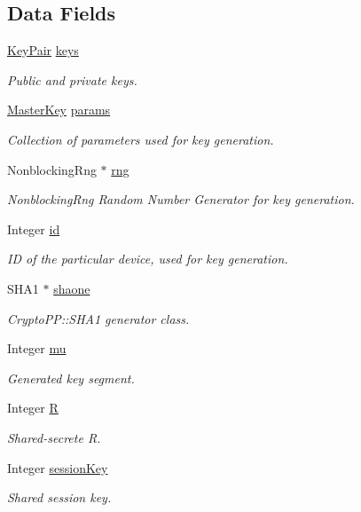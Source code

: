 \subsection*{Data Fields}
\begin{DoxyCompactItemize}
\item 
\hyperlink{structSMImp_1_1KeyPair}{Key\+Pair} \hyperlink{classSMImp_1_1Requester_a9203ce4677233f2dba858b5b6ec2d8be}{keys}
\begin{DoxyCompactList}\small\item\em Public and private keys. \end{DoxyCompactList}\item 
\hyperlink{structSMImp_1_1MasterKey}{Master\+Key} \hyperlink{classSMImp_1_1Requester_a140f38a7e3106bf0df39eb6370fca2f0}{params}
\begin{DoxyCompactList}\small\item\em Collection of parameters used for key generation. \end{DoxyCompactList}\item 
Nonblocking\+Rng $\ast$ \hyperlink{classSMImp_1_1Requester_aafd8f13c137f7372eda2e4f781048402}{rng}
\begin{DoxyCompactList}\small\item\em Nonblocking\+Rng Random Number Generator for key generation. \end{DoxyCompactList}\item 
Integer \hyperlink{classSMImp_1_1Requester_a16911083f2e3fc903ed3e6e7ca2a58b1}{id}
\begin{DoxyCompactList}\small\item\em ID of the particular device, used for key generation. \end{DoxyCompactList}\item 
S\+H\+A1 $\ast$ \hyperlink{classSMImp_1_1Requester_aab1bd0f1a383b17cad9e2621c2650411}{shaone}
\begin{DoxyCompactList}\small\item\em Crypto\+P\+P\+::\+S\+H\+A1 generator class. \end{DoxyCompactList}\item 
Integer \hyperlink{classSMImp_1_1Requester_a2acc3ab496a01ff90429b95d6af6ef32}{mu}
\begin{DoxyCompactList}\small\item\em Generated key segment. \end{DoxyCompactList}\item 
Integer \hyperlink{classSMImp_1_1Requester_ac5f95176425aabf5fa3fb4bb8d152167}{R}
\begin{DoxyCompactList}\small\item\em Shared-\/secrete R. \end{DoxyCompactList}\item 
Integer \hyperlink{classSMImp_1_1Requester_a95d364e3698162c3d3f2502da572bc23}{session\+Key}
\begin{DoxyCompactList}\small\item\em Shared session key. \end{DoxyCompactList}\end{DoxyCompactItemize}


